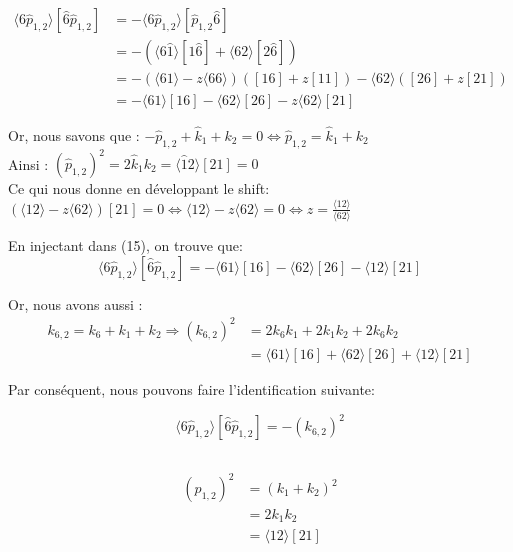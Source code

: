\documentclass[12pt, a4paper]{article}
\begin{document}
		\subsection{}
		\begin{equation}
			\begin{split}
				\langle 6 \hat{p}_{1,2} \rangle [\hat{6}\hat{p}_{1,2}]
				&=-\langle 6 \hat{p}_{1,2} \rangle [\hat{p}_{1,2}\hat{6}] \\
				&=-(\langle 6 \hat{1} \rangle [1 \hat{6}] + \langle 62 \rangle [2 \hat{6}])\\
				&=- (\langle 61 \rangle - z \langle 66 \rangle)([16] + z [11]) 
				- \langle 62 \rangle ([26] + z [21])\\
				&= - \langle 61 \rangle [16] - \langle 62 \rangle [26] 
				- z \langle 62 \rangle [21]
			\end{split}
		\end{equation}
		
		Or, nous savons que : $-\hat{p}_{1,2} + \hat{k}_1 + k_2 =0 \Leftrightarrow \hat{p}_{1,2} =\hat{k}_1 + k_2  $\\
		
		Ainsi : $ (\hat{p}_{1,2})^2= 2 \hat{k}_1 k_2 = \langle \hat{1} 2 \rangle [21] =0 $ \\
		
		Ce qui nous donne en développant le shift: $(\langle 12 \rangle - z \langle 62 \rangle)[21]=0 \Leftrightarrow \langle 12 \rangle - z \langle 62 \rangle =0 \Leftrightarrow z= \frac{\langle 12 \rangle}{\langle 62 \rangle}$
		
		En injectant dans (15), on trouve que:
		\[\langle 6 \hat{p}_{1,2} \rangle [\hat{6}\hat{p}_{1,2}]=
		- \langle 61 \rangle [16] - \langle 62 \rangle [26] 
		- \langle 12 \rangle [21]\]
		
		Or, nous avons aussi :
		\begin{equation}
			\begin{split}
				k_{6,2}= k_6 + k_1 + k_2 \Rightarrow (k_{6,2})^2
				&= 2k_6 k_1 + 2k_1 k_2 + 2k_6 k_2 \\
				&=	\langle 61 \rangle [16] + \langle 62 \rangle [26] 
				+\langle 12 \rangle [21]
			\end{split}
		\end{equation}
		
		Par conséquent, nous pouvons faire l'identification suivante:
		
		\[\langle 6 \hat{p}_{1,2} \rangle [\hat{6}\hat{p}_{1,2}]=-(k_{6,2})^2\]
		
		\subsection{}
		\begin{equation}
			\begin{split}
				(p_{1,2})^2
				&=(k_1 + k_2)^2\\
				&=2k_1 k_2\\
				&=\langle 12 \rangle [21]
			\end{split}
		\end{equation}
		
\end{document}
